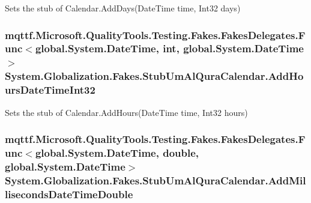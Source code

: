 Sets the stub of Calendar.\-Add\-Days(\-Date\-Time time, Int32 days)

\hypertarget{class_system_1_1_globalization_1_1_fakes_1_1_stub_um_al_qura_calendar_a2ec22e9be0f5451c73c7371c31f2ab0e}{
\subsubsection[{Add\-Hours\-Date\-Time\-Int32}]{\setlength{\rightskip}{0pt plus 5cm}mqttf.\-Microsoft.\-Quality\-Tools.\-Testing.\-Fakes.\-Fakes\-Delegates.\-Func$<$global.\-System.\-Date\-Time, int, global.\-System.\-Date\-Time$>$ System.\-Globalization.\-Fakes.\-Stub\-Um\-Al\-Qura\-Calendar.\-Add\-Hours\-Date\-Time\-Int32}}\label{class_system_1_1_globalization_1_1_fakes_1_1_stub_um_al_qura_calendar_a2ec22e9be0f5451c73c7371c31f2ab0e}


Sets the stub of Calendar.\-Add\-Hours(\-Date\-Time time, Int32 hours)

\hypertarget{class_system_1_1_globalization_1_1_fakes_1_1_stub_um_al_qura_calendar_ae438e1f1619dc136f8563d8766df8ef9}{
\subsubsection[{Add\-Milliseconds\-Date\-Time\-Double}]{\setlength{\rightskip}{0pt plus 5cm}mqttf.\-Microsoft.\-Quality\-Tools.\-Testing.\-Fakes.\-Fakes\-Delegates.\-Func$<$global.\-System.\-Date\-Time, double, global.\-System.\-Date\-Time$>$ System.\-Globalization.\-Fakes.\-Stub\-Um\-Al\-Qura\-Calendar.\-Add\-Milliseconds\-Date\-Time\-Double}}\label{class_system_1_1_globalization_1_1_fakes_1_1_stub_um_al_qura_calendar_ae438e1f1619dc136f8563d8766df8ef9}


